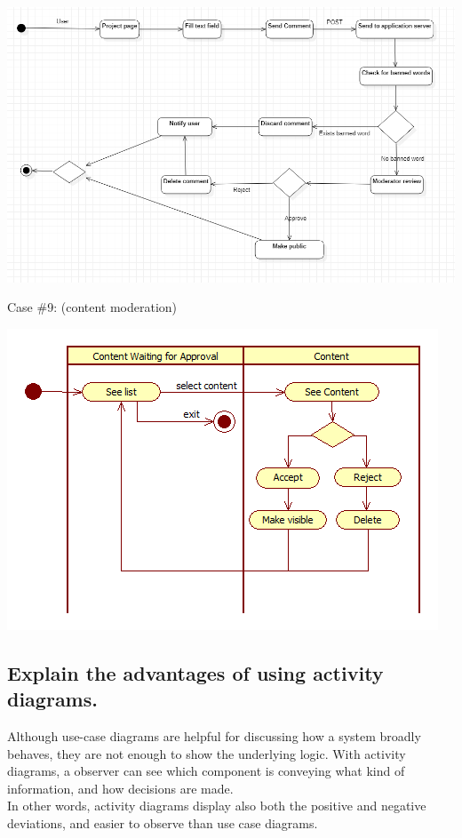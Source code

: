 			\includegraphics[width=\textwidth]{images/UseCase8_Comment.png}	
			
			\newpage
			\noindent Case \#9:
			(content moderation)
			
			\includegraphics[width=\textwidth]{images/ActivityDiagram1.png}	
		
		\subsection{Explain the advantages of using activity diagrams.}
		
		Although use-case diagrams are helpful for discussing how a system broadly behaves, they are not enough to show the underlying logic. With activity diagrams, a observer can see which component is conveying what kind of information, and how decisions are made.\\
		
		In other words, activity diagrams display also both the positive and negative deviations, and easier to observe than use case diagrams.